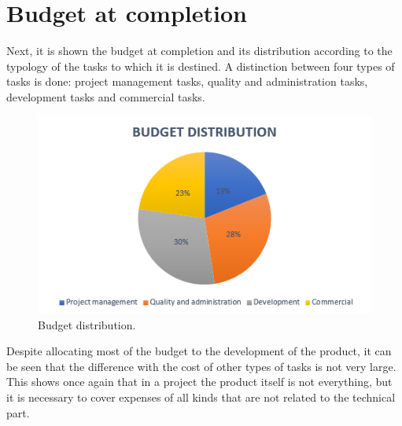 \section{Budget at completion}

Next, it is shown the budget at completion and its distribution according to the typology of the tasks to which it is destined. A distinction between four types of tasks is done: project management tasks, quality and administration tasks, development tasks and commercial tasks.
\begin{figure}[H]
	\centering
	\includegraphics[width=0.8\linewidth]{./images/BudgetDistribution}
	\caption[Budget distribution]{Budget distribution.}
	\label{fig:BudgetDistribution}
\end{figure} 

Despite allocating most of the budget to the development of the product, it can be seen that the difference with the cost of other types of tasks is not very large. This shows once again that in a project the product itself is not everything, but it is necessary to cover expenses of all kinds that are not related to the technical part. 